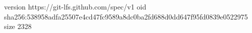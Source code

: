 version https://git-lfs.github.com/spec/v1
oid sha256:538958adfa25507e4cd47fc9589a8dc0ba2fd688d0dd647f95fd0839e0522975
size 2328
